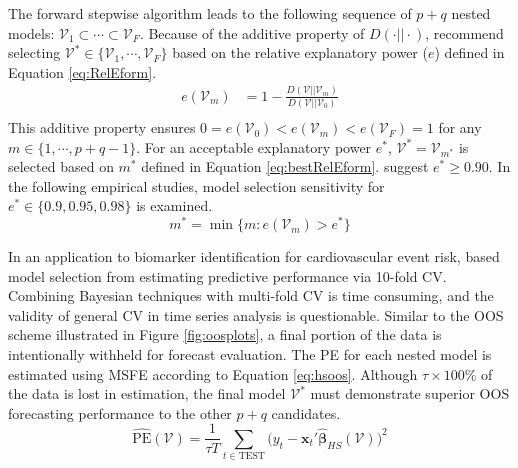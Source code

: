 The forward stepwise algorithm leads to the following sequence of $p+q$ nested models: $\mathcal{V}_1 \subset \cdots \subset \mathcal{V}_F$. Because of the additive property of $D(\cdot||\cdot)$, \cite{Dupuis2003} recommend selecting $\mathcal{V}^* \in \{\mathcal{V}_1,\cdots,\mathcal{V}_F\}$ based on the relative explanatory power ($e$) defined in Equation \ref{eq:RelEform}. 
\begin{equation}
\label{eq:RelEform}
\begin{split}
e(\mathcal{V}_{m})&=1-\frac{D(\mathcal{V}||\mathcal{V}_m)}{D(\mathcal{V}||\mathcal{V}_0)}\\
\end{split}
\end{equation}
This additive property ensures $0=e(\mathcal{V}_{0}) < e(\mathcal{V}_{m})< e(\mathcal{V}_{F})=1$ for any $m\in\{1,\cdots,p+q-1\}$. For an acceptable explanatory power $e^*$, $\mathcal{V}^*=\mathcal{V}_{m^*}$ is selected based on $m^*$ defined in Equation \ref{eq:bestRelEform}. \cite{Piironen2015} suggest $e^*\geq 0.90$.  In the following empirical studies, model selection sensitivity for $e^*\in\{0.9,0.95,0.98\}$ is examined.
\begin{equation}
\label{eq:bestRelEform}
m^*=\min \{m: e(\mathcal{V}_{m})>e^*\}
\end{equation}

In an application to biomarker identification for cardiovascular event risk, \cite{Peltola2014} based model selection from estimating predictive performance via 10-fold CV. Combining Bayesian techniques with multi-fold CV is time consuming, and the validity of general CV in time series analysis is questionable. Similar to the OOS scheme illustrated in Figure \ref{fig:oosplots}, a final portion of the data is intentionally withheld for forecast evaluation. The PE for each nested model is estimated using MSFE according to Equation \ref{eq:hsoos}. Although  $\tau\times 100\%$ of the data is lost in estimation, the final model $\mathcal{V}^*$ must demonstrate superior OOS forecasting performance to the other $p+q$ candidates.
\begin{equation}
\label{eq:hsoos}
	\widehat{\textrm{PE}}(\mathcal{V})=\frac{1}{\tau T}\sum\limits_{t\in \textrm{TEST}} \bigg(y_t-\bm{x}_t'\hat{\bm{\beta}}_{HS}(\mathcal{V})\bigg)^2
\end{equation}











